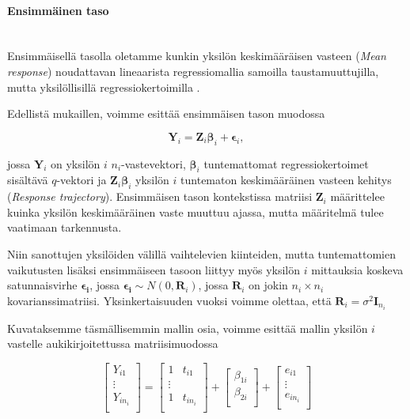 \documentclass[finnish]{docopts}
\begin{document}
\paragraph{Ensimmäinen taso}\mbox{}\\

Ensimmäisellä tasolla oletamme kunkin yksilön keskimääräisen vasteen (\textit{Mean response}) noudattavan lineaarista regressiomallia samoilla taustamuuttujilla, mutta yksilöllisillä regressiokertoimilla \cite{fitzmaurice11}. 

Edellistä mukaillen, voimme esittää ensimmäisen tason muodossa

$$
\bm{Y}_i = \bm{Z}_i \bm{\beta}_i + \bm{\epsilon}_i,
$$

jossa $\bm{Y}_i$ on yksilön $i$ $n_i$-vastevektori, $\bm{\beta}_i$ tuntemattomat regressiokertoimet sisältävä $q$-vektori ja $\bm{Z}_i \bm{\beta}_i$ yksilön $i$ tuntematon keskimääräinen vasteen kehitys (\textit{Response trajectory}). Ensimmäisen tason kontekstissa matriisi $\bm{Z}_i$ määrittelee kuinka yksilön keskimääräinen vaste muuttuu ajassa, mutta määritelmä tulee vaatimaan tarkennusta.

Niin sanottujen yksilöiden välillä vaihtelevien kiinteiden, mutta tuntemattomien vaikutusten lisäksi ensimmäiseen tasoon liittyy myös yksilön $i$ mittauksia koskeva satunnaisvirhe $\bm{\epsilon_i}$, jossa $\bm{\epsilon_i} \sim N(0,\bm{R}_i)$, jossa $\bm{R}_i$ on jokin $n_i \times n_i$ kovarianssimatriisi. Yksinkertaisuuden vuoksi voimme olettaa, että $\bm{R}_i = \sigma^2\bm{I}_{n_i}$

Kuvataksemme täsmällisemmin mallin osia, voimme esittää mallin yksilön $i$ vastelle aukikirjoitettussa matriisimuodossa

$$
\begin{bmatrix}
Y_{i1} \\
\vdots \\
Y_{in_{i}} \\
\end{bmatrix}=
\begin{bmatrix}
1 & t_{i1} \\
\vdots \\
1 & t_{in_{i}} \\
\end{bmatrix}+
\begin{bmatrix}
\beta_{1i} \\
\beta_{2i} \\
\end{bmatrix}+
\begin{bmatrix}
e_{i1} \\
\vdots \\
e_{in_{i}} \\
\end{bmatrix}
$$
\end{document}
